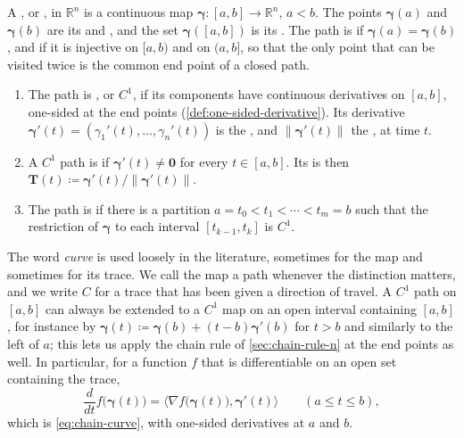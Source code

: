 \begin{definition}[Paths]
\label{def:path}
A , or , in $\mathbb R^n$ is a continuous map $\boldsymbol\gamma\colon[a,b]\to\mathbb R^n$, $a<b$. The points $\boldsymbol\gamma(a)$ and $\boldsymbol\gamma(b)$ are its  and , and the set $\boldsymbol\gamma([a,b])$ is its . The path is  if $\boldsymbol\gamma(a)=\boldsymbol\gamma(b)$, and  if it is injective on $[a,b)$ and on $(a,b]$, so that the only point that can be visited twice is the common end point of a closed path.
\begin{enumerate}
\item The path is , or $C^1$, if its components have continuous derivatives on $[a,b]$, one-sided at the end points (\cref{def:one-sided-derivative}). Its derivative $\boldsymbol\gamma'(t)=(\gamma_1'(t),\ldots,\gamma_n'(t))$ is the , and $\|\boldsymbol\gamma'(t)\|$ the , at time $t$.
\item A $C^1$ path is  if $\boldsymbol\gamma'(t)\ne\mathbf0$ for every $t\in[a,b]$. Its  is then $\mathbf T(t)\coloneqq\boldsymbol\gamma'(t)/\|\boldsymbol\gamma'(t)\|$.
\item The path is  if there is a partition $a=t_0<t_1<\cdots<t_m=b$ such that the restriction of $\boldsymbol\gamma$ to each interval $[t_{k-1},t_k]$ is $C^1$.
\end{enumerate}
\end{definition}

The word \emph{curve} is used loosely in the literature, sometimes for the map and sometimes for its trace. We call the map a path whenever the distinction matters, and we write $C$ for a trace that has been given a direction of travel. A $C^1$ path on $[a,b]$ can always be extended to a $C^1$ map on an open interval containing $[a,b]$, for instance by $\boldsymbol\gamma(t)\coloneqq\boldsymbol\gamma(b)+(t-b)\boldsymbol\gamma'(b)$ for $t>b$ and similarly to the left of $a$; this lets us apply the chain rule of \cref{sec:chain-rule-n} at the end points as well. In particular, for a function $f$ that is differentiable on an open set containing the trace,
\begin{equation}
\frac d{dt}f\bigl(\boldsymbol\gamma(t)\bigr)=\bigl\langle\nabla f\bigl(\boldsymbol\gamma(t)\bigr),\boldsymbol\gamma'(t)\bigr\rangle\qquad(a\le t\le b),
\label{eq:chain-path}
\end{equation}
which is \eqref{eq:chain-curve}, with one-sided derivatives at $a$ and $b$.

